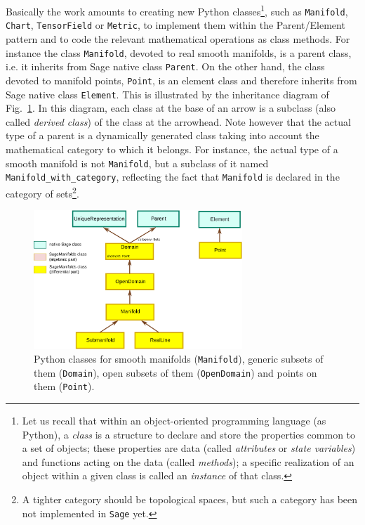 \documentclass[a4paper]{jpconf}
\newcommand{\soft}[1]{\texttt{#1}}
\newcommand{\code}[1]{\texttt{#1}}
\newcommand{\Sage}{\soft{Sage}}
\begin{document}
Basically the work amounts to creating new Python classes\footnote{Let us
recall that within an object-oriented programming language (as Python),
a \emph{class} is a structure to declare and store the
properties common to a set of objects; these properties 
are data (called 
\emph{attributes} or \emph{state variables}) and functions acting 
on the data (called \emph{methods}); a specific realization of an object 
within a given class is called an \emph{instance} of that class.},
 such as 
\code{Manifold}, \code{Chart}, \code{TensorField} or \code{Metric},
to implement them within the Parent/Element pattern and to 
code the relevant mathematical operations as class methods.
For instance the class \code{Manifold}, devoted to real smooth manifolds,
is a parent class, i.e. it inherits from Sage native class \code{Parent}.
On the other hand, the class devoted to manifold points, \code{Point}, 
is an element class and therefore inherits from Sage native class 
\code{Element}.
This is illustrated by the inheritance diagram of Fig.~\ref{f:domain_classes}.
In this diagram, each class at the base of an arrow is a subclass (also
called \emph{derived class}) of the class at the arrowhead.
Note however that the actual type of a parent is a dynamically generated
class taking into account the mathematical category to which it belongs. 
For instance, the actual type of a smooth manifold is not \code{Manifold}, but a
subclass of it named \code{Manifold\_with\_category}, 
reflecting the fact that \code{Manifold} is
declared in the category of sets\footnote{A tighter category should be
topological spaces, but such a category has been not implemented in \Sage{} yet.}.

\begin{figure}
\begin{center}
\includegraphics[width=0.7\textwidth]{domain_classes.pdf}
\end{center}
\caption{\label{f:domain_classes} Python classes for 
smooth manifolds (\code{Manifold}), generic subsets of them 
(\code{Domain}), open subsets of them (\code{OpenDomain})
and points on them (\code{Point}).}
\end{figure}
\end{document}
